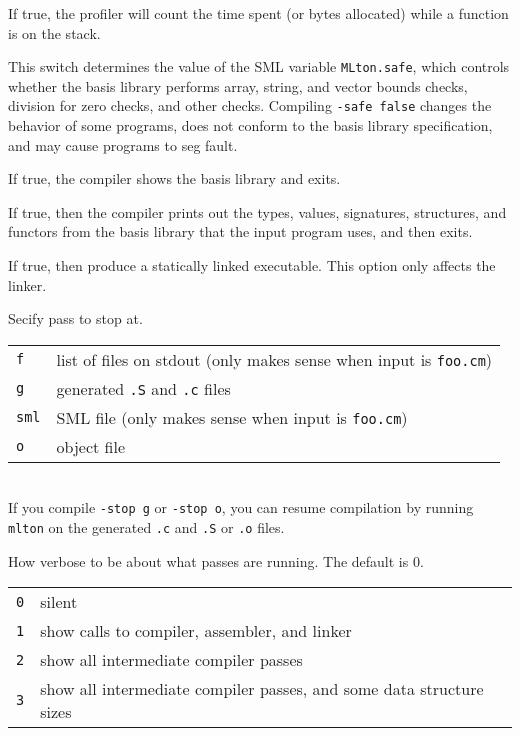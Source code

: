 \begin{description}
If true, the profiler will count the time spent (or bytes allocated)
while a function is on the stack.

This switch determines the value of the SML variable {\tt MLton.safe}, which
controls whether the basis library performs array, string, and vector bounds
checks, division for zero checks, and other checks.  Compiling {\tt -safe false}
changes the behavior of some programs, does not conform to the basis library
specification, and may cause programs to seg fault.

If true, the compiler shows the basis library and exits.

If true, then the compiler prints out the types, values, signatures, structures,
and functors from the basis library that the input program uses, and then exits.

If true, then produce a statically linked executable.  This option only
affects the linker.

Secify pass to stop at.\\
\begin{tabular}{ll}
{\tt f} & list of files on stdout (only makes sense when input is {\tt foo.cm})\\
{\tt g} & generated {\tt .S} and {\tt .c} files\\
{\tt sml} & SML file (only makes sense when input is {\tt foo.cm})\\
{\tt o} & object file\\
\end{tabular}\\
If you compile {\tt -stop g} or {\tt -stop o}, you can resume compilation by
running {\tt mlton} on the generated {\tt .c} and {\tt .S} or {\tt .o} files.

How verbose to be about what passes are running.  The default is 0.\\
\begin{tabular}{ll}
{\tt 0} & silent\\
{\tt 1} & show calls to compiler, assembler, and linker\\
{\tt 2} & show all intermediate compiler passes\\
{\tt 3} & show all intermediate compiler passes, and some data structure sizes\\
\end{tabular}\\

\end{description}

